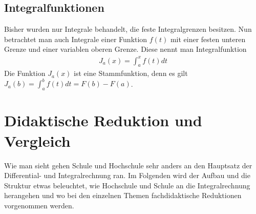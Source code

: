 \documentclass[a4paper]{article}
\begin{document}
\subsection{Integralfunktionen}
Bisher wurden nur Integrale behandelt, die feste Integralgrenzen besitzen. Nun betrachtet man auch Integrale einer Funktion $f(t)$ mit einer festen unteren Grenze und einer variablen oberen Grenze. Diese nennt man Integralfunktion
\begin{align*}
J_a(x) = \int_a^x f(t) dt
\end{align*}
Die Funktion $J_a(x)$ ist eine Stammfunktion, denn es gilt $J_a(b) = \int_a^b f(t) dt = F(b) - F(a)$. 
\section{Didaktische Reduktion und Vergleich}
Wie man sieht gehen Schule und Hochschule sehr anders an den Hauptsatz der Differential- und Integralrechnung ran. Im Folgenden wird der Aufbau und die Struktur etwas beleuchtet, wie Hochschule und Schule an die Integralrechnung herangehen und wo bei den einzelnen Themen fachdidaktische Reduktionen vorgenommen werden. 
\end{document}

